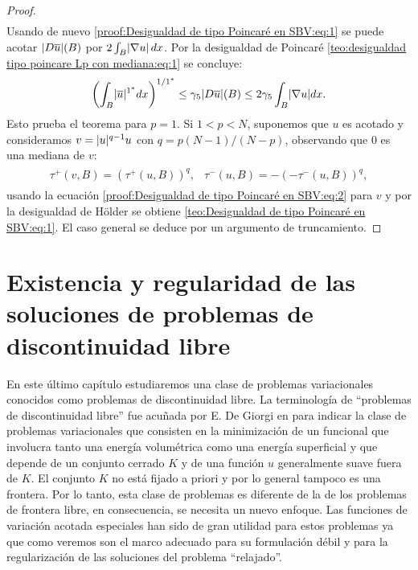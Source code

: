 \documentclass[a4paper,11pt,spanish, twoside, leqno]{tfm-uam}
\begin{document}
\begin{proof}
\begin{align*}
\end{align*}
Usando de nuevo \ref{proof:Desigualdad de tipo Poincaré en SBV:eq:1} se puede acotar $\lvert D\overline{u}\rvert(B)$ por $2\int_{B}\lvert\nabla{u}\rvert\,dx$. Por la desigualdad de Poincaré \ref{teo:desigualdad tipo poincare Lp con mediana:eq:1} se concluye:
\begin{align}\label{proof:Desigualdad de tipo Poincaré en SBV:eq:2}
\left ( \int_{B}\lvert\overline{u}\rvert^{1^{*}}dx\right )^{1/1^{*}}\leq \gamma_{5}\lvert D\overline{u}\rvert(B)\leq 2\gamma_{5}\int_{B}\lvert\nabla{u}\rvert dx.
\end{align}
Esto prueba el teorema para $p=1$. Si $1<p<N$, suponemos que $u$ es acotado y consideramos $v=\lvert u\rvert^{q-1}u$ con $q=p(N-1)/(N-p)$, observando que $0$ es una mediana de $v$:
\begin{align*}
\begin{array}{ll}
\tau^{+}(v,B)=(\tau^{+}(u,B))^{q},& \tau^{-}(u,B)=-(-\tau^{-}(u,B))^{q},
\end{array}
\end{align*}
usando la ecuación \ref{proof:Desigualdad de tipo Poincaré en SBV:eq:2} para $v$ y por la desigualdad de Hölder se obtiene \ref{teo:Desigualdad de tipo Poincaré en SBV:eq:1}. El caso general se deduce por un argumento de truncamiento. 
\end{proof}


\chapter{Existencia y regularidad de las soluciones de problemas de discontinuidad libre} \label{cap:cap4}

En este último capítulo estudiaremos una clase de problemas variacionales conocidos como problemas de discontinuidad libre. La terminología de ``problemas de discontinuidad libre'' fue acuñada por E. De Giorgi en \cite{de1991free} para indicar la clase de problemas variacionales que consisten en la minimización de un funcional que involucra tanto una energía volumétrica como una energía superficial y que depende de un conjunto cerrado $K$ y de una función $u$ generalmente suave fuera de $K$. El conjunto $K$ no está fijado a priori y por lo general tampoco es una frontera. Por lo tanto, esta clase de problemas es diferente de la de los problemas de frontera libre, en consecuencia, se necesita un nuevo enfoque. Las funciones de variación acotada especiales han sido de gran utilidad para estos problemas ya que como veremos son el marco adecuado para su formulación débil y para la regularización de las soluciones del problema ``relajado''.
\end{document}
